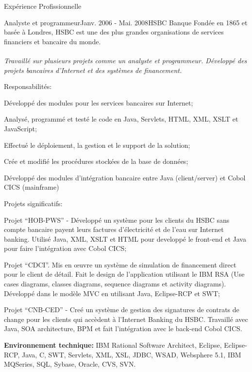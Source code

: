 \documentclass{resume}
\begin{document}
\begin{rSection}{Expérience Profissionnelle}
    \begin{rSubsection}{\fontsize{12}{14}\selectfont Analyste et programmeur}{\fontsize{12}{14}\selectfont Janv. 2006 - Mai. 2008}{\fontsize{12}{14}\selectfont HSBC Banque}{}
    Fondée en 1865 et basée à Londres, HSBC est une des plus grandes organisations de services financiers et bancaire du monde.\\\\

    \textit{Travaillé sur plusieurs projets comme un analyste et programmeur. Développé des projets bancaires d'Internet et des systèmes de financement.}
    \end{rSubsection}
      \begin{rSubsection}{\fontsize{9}{10}\selectfont Responsabilités:}{}{}{}
        \item Développé des modules pour les services bancaires sur Internet;
        \item Analysé, programmé et testé le code en Java, Servlets, HTML, XML, XSLT et JavaScript;
        \item Effectué le déploiement, la gestion et le support de la solution;
        \item Crée et modifié les procédures stockées de la base de données;
        \item Développé des modules d'intégration bancaire entre Java (client/server) et Cobol CICS (mainframe)
      \end{rSubsection}

      \begin{rSubsection}{\fontsize{9}{10}\selectfont Projets significatifs:}{}{}{}
        \item Projet “HOB-PWS” - Développé un système pour les clients du HSBC sans compte bancaire payent leurs factures d'électricité et de l'eau sur Internet banking. Utilisé Java, XML, XSLT et HTML pour developpé le front-end et Java pour faire l'intégration avec Cobol CICS;
        \item Projet “CDCI”. Mis en œuvre un système de simulation de financement direct pour le client de détail. Fait le design de l’application utilisant le IBM RSA (Use cases diagrams, classes diagrams, sequence diagrams et activity diagrams). Développé dans le modèle MVC en utilisant Java, Eclipse-RCP et SWT;
        \item Projet “CNB-CED” - Creé un système de gestion des signatures de contrats de change pour les clients qui accèdent à l'Internet Banking du HSBC. Travaillé avec Java, SOA architecture, BPM et fait l'intégration avec le back-end Cobol CICS.
      \end{rSubsection}

      {\fontsize{8}{9}\selectfont \textbf{Environnement technique:} IBM Rational Software Architect, Eclipse, Eclipse-RCP, Java, C, SWT, Servlets, XML, XSL, JDBC, WSAD, Websphere 5.1, IBM MQSeries, SQL, Sybase, Oracle, CVS, SVN.}

  \end{rSection}
\end{document}
